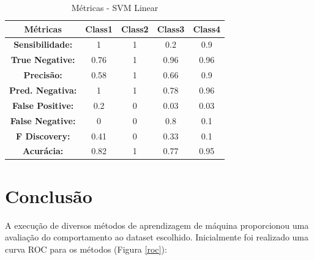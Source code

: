 \documentclass[
	article,			%
	11pt,				%
	oneside,			%
	a4paper,			%
	english,			%
	brazil,				%
	sumario=tradicional
	]{abntex2}
\begin{document}
\begin{table}[H]
\centering
\begin{tabular}{|c|c|c|c|c|}
\hline
\textbf{Métricas}        & \textbf{Class1} & \textbf{Class2} & \textbf{Class3} & \textbf{Class4} \\ \hline
\textbf{Sensibilidade:}  & 1               & 1               & 0.2             & 0.9             \\ \hline
\textbf{True Negative:}  & 0.76            & 1               & 0.96            & 0.96            \\ \hline
\textbf{Precisão:}       & 0.58            & 1               & 0.66            & 0.9             \\ \hline
\textbf{Pred. Negativa:} & 1               & 1               & 0.78            & 0.96            \\ \hline
\textbf{False Positive:} & 0.2             & 0               & 0.03            & 0.03            \\ \hline
\textbf{False Negative:} & 0               & 0               & 0.8             & 0.1             \\ \hline
\textbf{F Discovery:}    & 0.41            & 0               & 0.33            & 0.1             \\ \hline
\textbf{Acurácia:}       & 0.82            & 1               & 0.77            & 0.95            \\ \hline
\end{tabular}
\caption{Métricas - SVM Linear}
\label{tab:metrics_svm}
\end{table}


\newpage
\section{Conclusão}

A execução de diversos métodos de aprendizagem de máquina proporcionou uma avaliação do comportamento ao dataset escolhido. Inicialmente foi realizado uma curva ROC para os métodos (Figura \ref{roc}):
\end{document}
